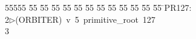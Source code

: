 %
%
\begin{tabbing}
55555 \= 55 \= 55 \= 55 \= 55 \= 55 \= 55 \= 55 \= 55 \= 55 \= 55 \= 55 \= 55 \= \>PR127:\\[0pt]
2\>$\triangleright$\>(ORBITER)\ v\ 5\ primitive\_root\ 127\\[0pt]
3\>\end{tabbing}

